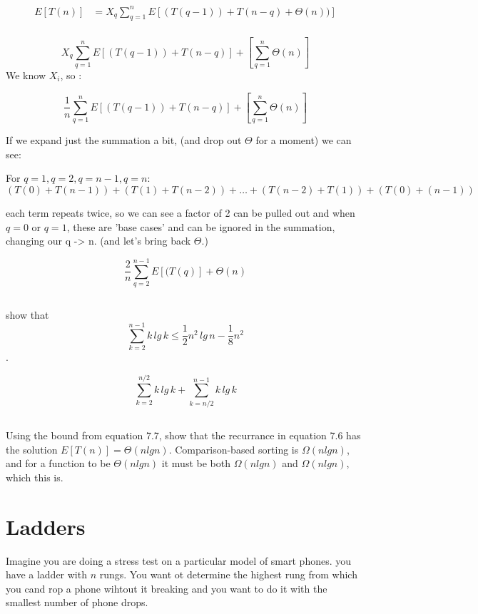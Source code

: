 \documentclass[titlepage]{article}\usepackage[]{graphicx}\usepackage[]{color}
\begin{document}
\begin{align}
 E[T(n)] &=  X_q \sum_{q=1}^{n} E \left[(T(q-1)) + T(n-q) + \Theta(n))\right] \\
\end{align}

\[ 
	X_q \sum_{q=1}^{n} E \left[ (T(q-1))+ T(n-q)\right] + \left[ \sum_{q=1}^{n}\Theta(n)\right] 
\]
We know $X_i$, so :

\[ \frac{1}{n} \sum_{q=1}^{n} E \left[ (T(q-1)) + T(n-q)\right] + \left[ \sum_{q=1}^{n}\Theta(n)\right] 
\]

If we expand just the summation a bit, (and drop out $\Theta$ for a moment) we can see:

For $q=1, q=2, q=n-1, q=n$:
\[
	(T(0) + T(n-1)) + (T(1) + T(n-2)) + \ldots + (T(n-2) + T(1)) + (T(0) +
	(n-1))
\]

each term repeats twice, so we can see a factor of 2 can be pulled out 
and when $q=0$ or $q=1$, these are 'base cases' and can be ignored in the
summation, changing our q -> n. (and let's bring back $\Theta$.)

\[
	\frac{2}{n} \sum_{q=2}^{n-1} E \left[ (T(q)\right] + \Theta(n)
\]


\subsection{}
show that 
\[ \sum_{k=2}^{n-1}k\, lg\, k \leq \frac{1}{2} n^2\, lg\, n - \frac{1}{8} n^2 \].

\[ \sum_{k=2}^{n/2}k \, lg\, k  + \sum_{k=n/2}^{n-1} k\,lg\,k \]



\subsection{}

Using the bound from equation 7.7, show that the recurrance in equation 7.6 has
the solution $E[T(n)] = \Theta(n lg n)$. 
Comparison-based sorting is $\Omega(n lg n)$, and for a function to be
$\Theta(n lg n)$ it must be both $\Omega(n lg n)$ and $\Omega(n lg n)$, which
this is. 




\section{ Ladders }
  Imagine you are doing a stress test on a particular model of smart phones. you
  have a ladder with $n$ rungs. You want ot determine the highest rung from which
  you cand rop a phone wihtout it breaking and you want to do it with the
smallest number of phone drops. 
\end{document}
